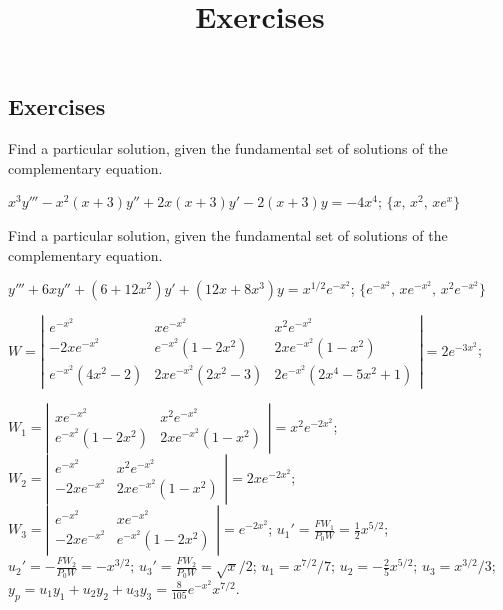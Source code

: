 \documentclass{ximera}
\title{Exercises} \license{CC BY-NC-SA 4.0}
\begin{document}
\begin{abstract}
\end{abstract}
\maketitle

\begin{onlineOnly}
\section*{Exercises}
\end{onlineOnly}

\begin{problem}\label{exer:9.4.1}
Find a particular
solution, given the fundamental set of solutions of the complementary equation.

$x^3y'''-x^2(x+3)y''+2x(x+3)y'-2(x+3)y=-4x^4$;\quad
$\{x,\,x^2,\,xe^x\}$
\end{problem}

\begin{problem}\label{exer:9.4.2}
Find a particular
solution, given the fundamental set of solutions of the complementary equation.

$y'''+6xy''+(6+12x^2)y'+(12x+8x^3)y=x^{1/2}e^{-x^2}$;\quad
 $\{e^{-x^2},\,xe^{-x^2},\,x^2e^{-x^2}\}$

\begin{solution}
$W=\left|\begin{array}{cccc}
e^{-x^2}&xe^{-x^2}&x^2e^{-x^2}\\
-2xe^{-x^2}&e^{-x^2}(1-2x^2)&2x
e^{-x^2}(1-x^2)\\
e^{-x^2}(4x^2-2)&2xe^{-x^2}(2x^2-3)&2e^{-x^2}(2x^4-5x^2+1)
\end{array}\right|=2e^{-3x^2}$;

$W_1=\left|\begin{array}{cccc}
xe^{-x^2}&x^2e^{-x^2}\\
e^{-x^2}(1-2x^2)&2xe^{-x^2}(1-x^2)
\end{array}\right|=x^2e^{-2x^2}$;
$W_2=\left|\begin{array}{cccc}
e^{-x^2}&x^2e^{-x^2}\\
-2xe^{-x^2}&2xe^{-x^2}(1-x^2)
\end{array}\right|=2xe^{-2x^2}$;
$W_3=\left|\begin{array}{cccc}
e^{-x^2}&xe^{-x^2}\\
-2xe^{-x^2}&e^{-x^2}(1-2x^2)
\end{array}\right|=e^{-2x^2}$;
$u_1'=\frac{FW_1}{P_0W}=\frac{1}{2}x^{5/2}$;
$u_2'=-\frac{FW_2}{P_0W}=-x^{3/2}$;
$u_3'=\frac{FW_2}{P_0W}= \sqrt{x}/2$;
$u_1=x^{7/2}/7$;
$u_2=-\frac{2}{5}x^{5/2}$;
$u_3=x^{3/2}/3$;
$y_p=u_1y_1+u_2y_2+u_3y_3=\frac{8}{105}e^{-x^2}x^{7/2}$.
\end{solution}
\end{problem}
\end{document}
